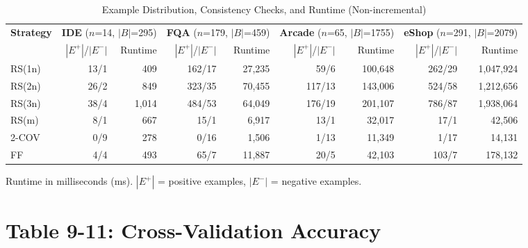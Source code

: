 \documentclass[11pt]{article}
\begin{document}
\begin{table}[htbp]
\centering
\caption{Example Distribution, Consistency Checks, and Runtime (Non-incremental)}
\label{tab:table7}
\begin{tabular}{l|rr|rr|rr|rr}
\toprule
\multirow{2}{*}{\textbf{Strategy}}
    & \multicolumn{2}{c|}{\textbf{IDE} ($n$=14, $|B|$=295)}
    & \multicolumn{2}{c|}{\textbf{FQA} ($n$=179, $|B|$=459)}
    & \multicolumn{2}{c|}{\textbf{Arcade} ($n$=65, $|B|$=1755)}
    & \multicolumn{2}{c}{\textbf{eShop} ($n$=291, $|B|$=2079)} \\
    & $|E^+|$/$|E^-|$ & Runtime
    & $|E^+|$/$|E^-|$ & Runtime
    & $|E^+|$/$|E^-|$ & Runtime
    & $|E^+|$/$|E^-|$ & Runtime \\
\midrule
RS(1n)  & 13/1   & 409     & 162/17  & 27,235   & 59/6    & 100,648  & 262/29  & 1,047,924 \\
RS(2n)  & 26/2   & 849     & 323/35  & 70,455   & 117/13  & 143,006  & 524/58  & 1,212,656 \\
RS(3n)  & 38/4   & 1,014   & 484/53  & 64,049   & 176/19  & 201,107  & 786/87  & 1,938,064 \\
RS(m)   & 8/1    & 667     & 15/1    & 6,917    & 13/1    & 32,017   & 17/1    & 42,506 \\
2-COV   & 0/9    & 278     & 0/16    & 1,506    & 1/13    & 11,349   & 1/17    & 14,131 \\
FF      & 4/4    & 493     & 65/7    & 11,887   & 20/5    & 42,103   & 103/7   & 178,132 \\
\bottomrule
\end{tabular}
\begin{flushleft}
\small Runtime in milliseconds (ms). $|E^+|$ = positive examples, $|E^-|$ = negative examples.
\end{flushleft}
\end{table}

\section{Table 9-11: Cross-Validation Accuracy}
\end{document}
